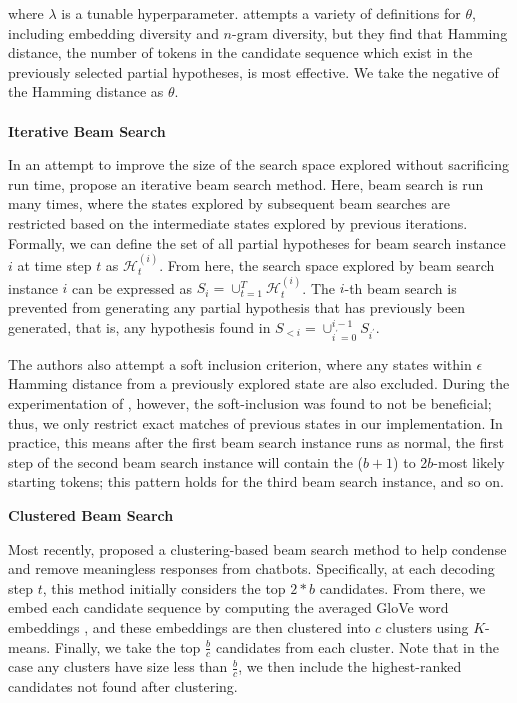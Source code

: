 \documentclass[thesis.tex]{subfiles}
\begin{document}
where $\lambda$ is a tunable hyperparameter. \cite{vijayakumar2016diverse} attempts a variety of definitions for $\theta$, including embedding diversity and $n$-gram diversity, but they find that Hamming distance, the number of tokens in the candidate sequence which exist in the previously selected partial hypotheses, is most effective. We take the negative of the Hamming distance as $\theta$. \\\\

\noindent\textbf{Iterative Beam Search}\quad

In an attempt to improve the size of the search space explored without sacrificing run time, \cite{kulikov2018importance} propose an iterative beam search method. Here, beam search is run many times, where the states explored by subsequent beam searches are restricted based on the intermediate states explored by previous iterations. Formally, we can define the set of all partial hypotheses for beam search instance $i$ at time step $t$ as $\mathcal{H}_t^{(i)}$. From here, the search space explored by beam search instance $i$ can be expressed as $S_i = \cup_{t=1}^T \mathcal{H}_t^{(i)}$. The $i$-th beam search is prevented from generating any partial hypothesis that has previously been generated, that is, any hypothesis found in $S_{<i} = \cup_{i^{\prime}=0}^{i-1}S_{i^{\prime}}$.

The authors also attempt a soft inclusion criterion, where any states within $\epsilon$ Hamming distance from a previously explored state are also excluded. During the experimentation of \cite{kulikov2018importance}, however, the soft-inclusion was found to not be beneficial; thus, we only restrict exact matches of previous states in our implementation.
In practice, this means after the first beam search instance runs as normal, the first step of the second beam search instance will contain the ($b+1$) to 2$b$-most likely starting tokens; this pattern holds for the third beam search instance, and so on.

\noindent\textbf{Clustered Beam Search}\quad

\noindent Most recently, \cite{tam2019clustered} proposed a clustering-based beam search method to help condense and remove meaningless responses from chatbots. Specifically, at each decoding step $t$, this method initially considers the top $2*b$ candidates. From there, we embed each candidate sequence by computing the averaged GloVe word embeddings \citep{pennington2014glove}, and these embeddings are then clustered into $c$ clusters using $K$-means. Finally, we take the top $\frac{b}{c}$ candidates from each cluster. Note that in the case any clusters have size less than $\frac{b}{c}$, we then include the highest-ranked candidates not found after clustering.
\end{document}
